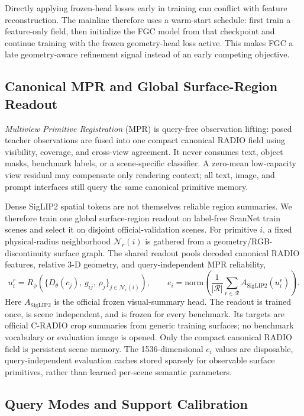 \documentclass[journal,twoside]{IEEEtran}
\begin{document}
Directly applying frozen-head losses early in training can conflict with feature
reconstruction. The mainline therefore uses a warm-start schedule: first train a
feature-only field, then initialize the FGC model from that checkpoint and
continue training with the frozen geometry-head loss active. This makes FGC a
late geometry-aware refinement signal instead of an early competing objective.

\subsection{Canonical MPR and Global Surface-Region Readout}

\emph{Multiview Primitive Registration} (MPR) is query-free observation
lifting: posed teacher observations are fused into one compact canonical RADIO
field using visibility, coverage, and cross-view agreement.  It never consumes
text, object masks, benchmark labels, or a scene-specific classifier.  A
zero-mean low-capacity view residual may compensate only rendering context; all
text, image, and prompt interfaces still query the same canonical primitive
memory.

Dense SigLIP2 spatial tokens are not themselves reliable region summaries.
We therefore train one global surface-region readout on label-free ScanNet train
scenes and select it on disjoint official-validation scenes.  For primitive
$i$, a fixed physical-radius neighborhood $\mathcal{N}_r(i)$ is gathered from a
geometry/RGB-discontinuity surface graph.  The shared readout pools decoded
canonical RADIO features, relative 3-D geometry, and query-independent MPR
reliability,
\[
  u_i^r = R_\phi\!\left(\{D_\theta(c_j),\,g_{ij},\,\rho_j\}_{j\in
  \mathcal{N}_r(i)}\right), \qquad
  e_i = \mathrm{norm}\!\left(\frac{1}{|\mathcal R|}
  \sum_{r\in\mathcal R} A_{\mathrm{SigLIP2}}(u_i^r)\right).
\]
Here $A_{\mathrm{SigLIP2}}$ is the official frozen visual-summary head.  The
readout is trained once, is scene independent, and is frozen for every
benchmark.  Its targets are official C-RADIO crop summaries from generic
training surfaces; no benchmark vocabulary or evaluation image is opened.
Only the compact canonical RADIO field is persistent scene memory.  The
1536-dimensional $e_i$ values are disposable, query-independent evaluation
caches stored sparsely for observable surface primitives, rather than learned
per-scene semantic parameters.

\subsection{Query Modes and Support Calibration}
\end{document}
